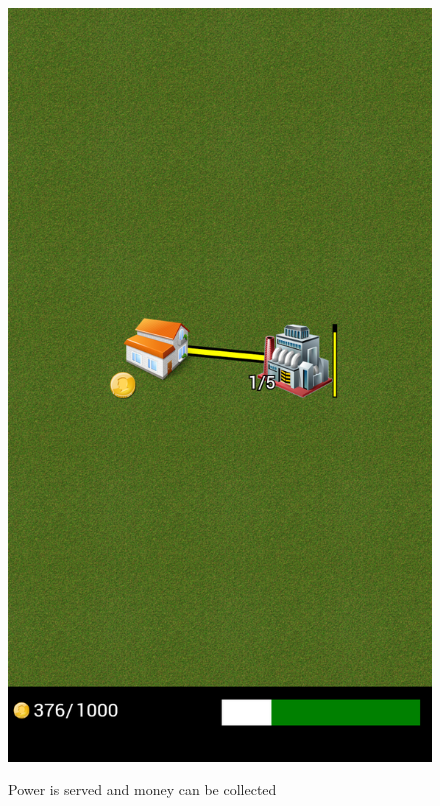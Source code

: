 \begin{figure}[H]
{			\includegraphics[scale=0.18]{pictures/sprint3-screen/buildPowerline_5.png}
		}
		\caption{Power is served and money can be collected}
	\end{figure}


